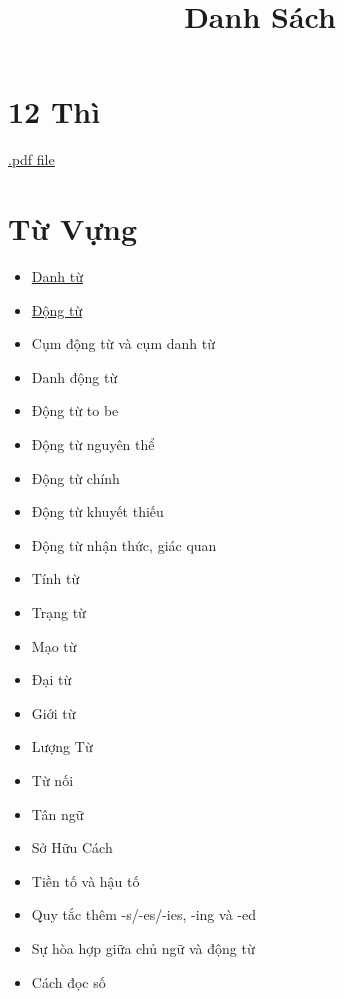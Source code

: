 \title{\Huge \textbf{Danh Sách}}
\maketitle
\tableofcontents

\chapter{12 Thì}
\href{https://github.com/theslime016/english-project/blob/main/english-project-release-files/12Tenses.pdf}
{.pdf file}
\chapter{Từ Vựng}
\begin{multicols*}{2}
    \begin{itemize}
        \item \href{https://github.com/theslime016/english-project/blob/main/english-project-release-files/Noun.pdf}{Danh từ}
        \item \href{https://github.com/theslime016/english-project/blob/main/english-project-release-files/Verb.pdf}{Động từ}
        \item Cụm động từ và cụm danh từ
        \item Danh động từ
        \item Động từ to be
        \item Động từ nguyên thể
        \item Động từ chính
        \item Động từ khuyết thiếu
        \item Động từ nhận thức, giác quan
        \item Tính từ
        \item Trạng từ
        \item Mạo từ
        \item Đại từ
        \item Giới từ
        \item Lượng Từ
        \item Từ nối
        \item Tân ngữ
        \item Sở Hữu Cách
        \item Tiền tố và hậu tố
        \item Quy tắc thêm -s/-es/-ies, -ing và -ed
        \item Sự hòa hợp giữa chủ ngữ và động từ
        \item Cách đọc số
    \end{itemize}
\end{multicols*}


